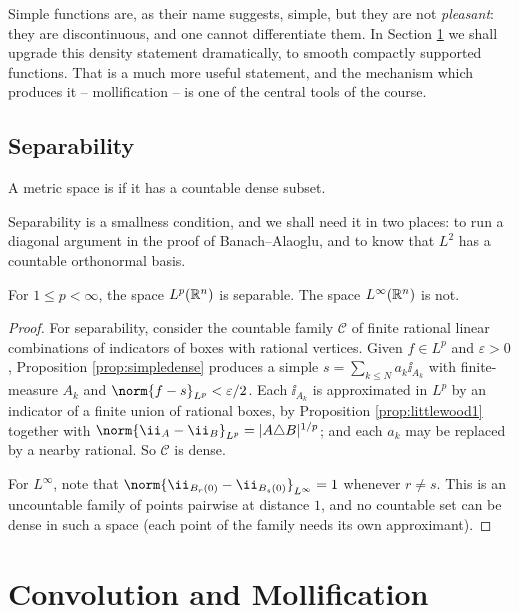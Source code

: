 \documentclass[a4paper]{scrartcl}
\begin{document}
Simple functions are, as their name suggests, simple, but they are not \emph{pleasant}: they are discontinuous, and one cannot differentiate them. In Section \ref{sec:mollify} we shall upgrade this density statement dramatically, to smooth compactly supported functions. That is a much more useful statement, and the mechanism which produces it -- mollification -- is one of the central tools of the course.

\subsection{Separability}

\begin{definition}
	A metric space is  if it has a countable dense subset.
\end{definition}

Separability is a smallness condition, and we shall need it in two places: to run a diagonal argument in the proof of Banach--Alaoglu, and to know that $L^2$ has a countable orthonormal basis.

\begin{proposition}\label{prop:separable}
	For $1 \le p < \infty$, the space $L^p(\mathbb{R}^n)$ is separable. The space $L^\infty(\mathbb{R}^n)$ is not.
\end{proposition}

\begin{proof}
	For separability, consider the countable family $\mathcal{C}$ of finite rational linear combinations of indicators of boxes with rational vertices. Given $f \in L^p$ and $\varepsilon > 0$, Proposition \ref{prop:simpledense} produces a simple $s = \sum_{k \le N} a_k \ii_{A_k}$ with finite-measure $A_k$ and $\norm{f - s}_{L^p} < \varepsilon/2$. Each $\ii_{A_k}$ is approximated in $L^p$ by an indicator of a finite union of rational boxes, by Proposition \ref{prop:littlewood1} together with $\norm{\ii_A - \ii_B}_{L^p} = |A \triangle B|^{1/p}$; and each $a_k$ may be replaced by a nearby rational. So $\mathcal{C}$ is dense.

	For $L^\infty$, note that $\norm{\ii_{B_r(0)} - \ii_{B_s(0)}}_{L^\infty} = 1$ whenever $r \ne s$. This is an uncountable family of points pairwise at distance $1$, and no countable set can be dense in such a space (each point of the family needs its own approximant).
\end{proof}

\section{Convolution and Mollification}\label{sec:mollify}
\end{document}

